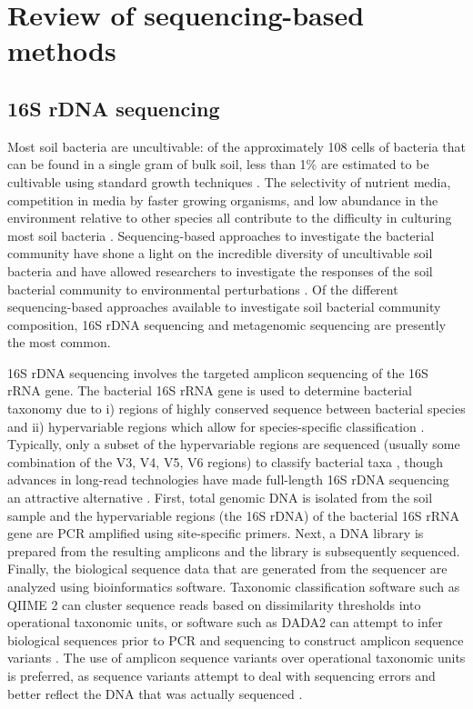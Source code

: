 \section{Review of sequencing-based methods}

\subsection{16S rDNA sequencing}

Most soil bacteria are uncultivable:
of the approximately 108 cells of bacteria that can be found in a single gram of bulk soil, less than 1\% are estimated to be cultivable using standard growth techniques \parencite{Raynaud.2014, vanPham.2012}.
The selectivity of nutrient media, competition in media by faster growing organisms, and low abundance in the environment relative to other species all contribute to the difficulty in culturing most soil bacteria \parencite[229–300]{vanElsas.2019b}.
Sequencing-based approaches to investigate the bacterial community have shone a light on the incredible diversity of uncultivable soil bacteria \parencite{Hug.2016} and have allowed researchers to investigate the responses of the soil bacterial community to environmental perturbations \parencite{Isobe.2019, Isobe.2020}.
Of the different sequencing-based approaches available to investigate soil bacterial community composition, 16S rDNA sequencing and metagenomic sequencing are presently the most common.

16S rDNA sequencing involves the targeted amplicon sequencing of the 16S rRNA gene.
The bacterial 16S rRNA gene is used to determine bacterial taxonomy due to i) regions of highly conserved sequence between bacterial species and ii) hypervariable regions which allow for species-specific classification \parencite{vanPham.2012}.
Typically, only a subset of the hypervariable regions are sequenced (usually some combination of the V3, V4, V5, V6 regions) to classify bacterial taxa \parencite{Yang.2016}, though advances in long-read technologies have made full-length 16S rDNA sequencing an attractive alternative \parencite{Shin.2016, Numberger.2019}.
First, total genomic DNA is isolated from the soil sample and the hypervariable regions (the 16S rDNA) of the bacterial 16S rRNA gene are PCR amplified using site-specific primers.
Next, a DNA library is prepared from the resulting amplicons and the library is subsequently sequenced.
Finally, the biological sequence data that are generated from the sequencer are analyzed using bioinformatics software.
Taxonomic classification software such as QIIME 2 can cluster sequence reads based on dissimilarity thresholds into operational taxonomic units, or software such as DADA2 can attempt to infer biological sequences prior to PCR and sequencing to construct amplicon sequence variants \parencite{Bolyen.2019, Callahan.2016}.
The use of amplicon sequence variants over operational taxonomic units is preferred, as sequence variants attempt to deal with sequencing errors and better reflect the DNA that was actually sequenced \parencite{Callahan.2017}.


